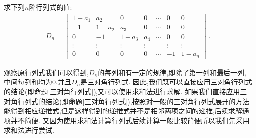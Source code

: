 \documentclass[../../main.tex]{subfiles}%
\begin{document}
\begin{exercise}\label{三对角行列式例题2}
求下列$n$阶行列式的值:
\begin{gather}
D_{n}=\begin{vmatrix}1-a_{1}&a_{2}&0&0&\cdots&0&0\\ -1&1-a_{2}&a_{3}&0&\cdots&0&0\\ 0&-1&1-a_{3}&a_{4}&\cdots&0&0\\ \vdots&\vdots&\vdots&\vdots&&\vdots&\vdots\\ 0&0&0&0&\cdots&-1&1-a_{n}\end{vmatrix}.
\nonumber
\end{gather}
\end{exercise}
\begin{note}
观察原行列式我们可以得到,$D_n$的每列和有一定的规律,即除了第一列和最后一列,中间每列和均为0.并且$D_n$是三对角行列式.
因此,我们既可以直接应用三对角行列式的结论(即命题\ref{三对角行列式}),又可以使用求和法进行求解.
如果我们直接应用三对角行列式的结论(即命题\ref{三对角行列式}),按照对一般的三对角行列式展开的方法能得到相应递推式,但是这样得到的递推式并不是相邻两项之间的递推,后续求解通项并不简便.
又因为使用求和法计算行列式后续计算一般比较简便所以我们先采用求和法进行尝试.
\end{note}
\end{document}
